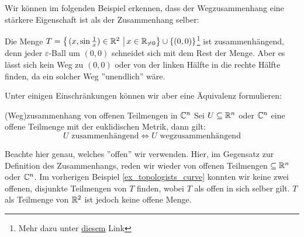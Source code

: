 Wir können im folgenden Beispiel erkennen, dass der Wegzusammenhang eine stärkere Eigenschaft ist als der Zusammenhang selber:

\begin{example}\label{ex_topologists_curve}
Die Menge $T = \left\{\left.(x,\sin \frac{1}{x}) \in \mathbb{R}^2 \ \right| x \in \mathbb{R}_{\neq 0} \right\} \cup \{(0,0)\}$\footnote{Mehr dazu unter \href{https://en.wikipedia.org/wiki/Topologist\%27s_sine_curve}{diesem} Link} ist zusammenhängend, denn jeder $\varepsilon$-Ball um $(0,0)$ schneidet sich mit dem Rest der Menge. Aber es lässt sich kein Weg zu $(0,0)$  oder von der linken Hälfte in die rechte Hälfte finden, da ein solcher Weg ''unendlich'' wäre.
\begin{figure}[hbt!]
    \centering
\end{figure}
\end{example}
Unter einigen Einschränkungen können wir aber eine Äquivalenz formulieren:
\begin{satz}{(Weg)zusammenhang von offenen Teilmengen in $\mathbb{C}^n$}{}
Sei $U \subseteq \mathbb{R}^n$ oder $\mathbb{C}^n$ eine offene Teilmenge mit der euklidischen Metrik, dann gilt:
$$U \text{ zusammenhängend} \iff U \text{ wegzusammenhängend}$$
\end{satz}
Beachte hier genau, welches ''offen'' wir verwenden. Hier, im Gegensatz zur Definition des Zusammenhangs, reden wir wieder von offenen Teilmengen $\subseteq \mathbb{R}^n$ oder $\mathbb{C}^n$. Im vorherigen Beispiel \ref{ex_topologists_curve} konnten wir keine zwei offenen, disjunkte Teilmengen von $T$ finden, wobei $T$ als offen in sich selber gilt. $T$ als Teilmenge von $\mathbb{R}^2$ ist jedoch keine offene Menge.
